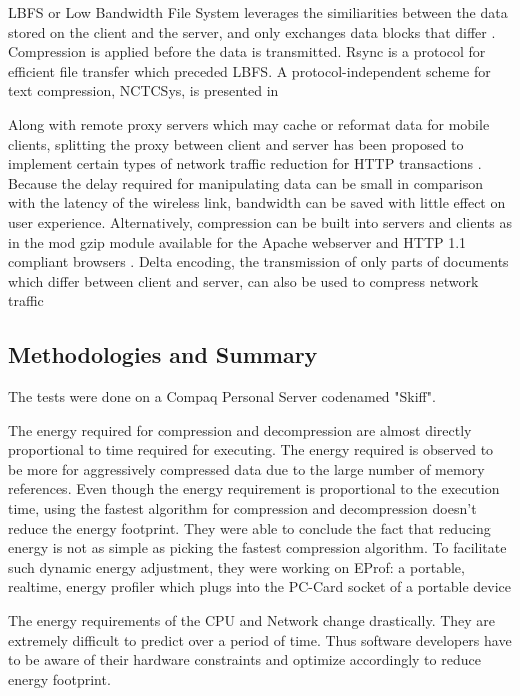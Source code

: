 \documentclass{article}
\begin{document}
LBFS or Low Bandwidth File System leverages the similiarities between the data stored on the client and the server, and only exchanges data blocks that differ \cite{muthitacharoen2001low}. Compression is applied before the data is transmitted. Rsync \cite{tridgell2000efficient} is a protocol for efficient file transfer which preceded LBFS. A protocol-independent scheme for text compression,
NCTCSys, is presented in \cite{motgi2001network}

Along with remote proxy servers which may cache or
reformat data for mobile clients, splitting the proxy between client and server has been proposed to implement certain types of network traffic reduction for HTTP transactions \cite{housel1996webexpress} \cite{krashinsky2003efficient}. Because the delay required for manipulating data can be small in comparison with the latency
of the wireless link, bandwidth can be saved with little
effect on user experience. Alternatively, compression
can be built into servers and clients as in the mod gzip
module available for the Apache webserver and HTTP
1.1 compliant browsers \cite{hyperspace}. Delta encoding, the transmission of only parts of documents which differ between
client and server, can also be used to compress network
traffic \cite{hunt1996empirical} \cite{mogul1999trace} \cite{mogul1997potential} \cite{santos1998increasing}


\subsection{Methodologies and Summary}
The tests were done on a Compaq Personal Server codenamed "Skiff".\cite{compaq}

The energy required for compression and decompression are almost directly proportional to time required for executing. The energy required is observed to be more for aggressively compressed data due to the large number of memory references. Even though the energy requirement is proportional to the execution time, using the fastest algorithm for compression and decompression doesn't reduce the energy footprint. They were able to conclude the fact that reducing energy is not as simple as picking the fastest compression algorithm. To facilitate such dynamic energy adjustment, they were working on EProf: a portable, realtime, energy profiler which plugs into the PC-Card socket of a portable device \cite{koskelin2002eprof}

The energy requirements of the CPU and Network change drastically. They are extremely difficult to predict over a period of time. Thus software developers have to be aware of their hardware constraints and optimize accordingly to reduce energy footprint. 
\end{document}
